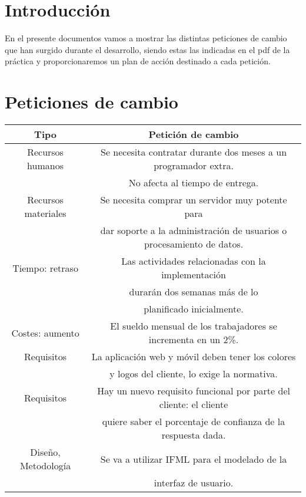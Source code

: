 	\listoftables	
	
	\newpage	
 
\section{Introducción}

En el presente documentos vamos a mostrar las distintas peticiones de cambio que han surgido durante el desarrollo, siendo estas las indicadas en el pdf de la práctica y proporcionaremos un plan de acción destinado a cada petición.

\section{Peticiones de cambio}

\begin{table}[H]
	\begin{center}
		\begin{tabular}{|c|c|} \toprule
			Tipo & Petición de cambio \\ \midrule
			Recursos humanos & Se necesita contratar durante dos meses a un programador extra.    \\ 
			& No afecta al tiempo de entrega. \\ \hline
			Recursos materiales & Se necesita comprar un servidor muy potente para  \\ 
			& dar soporte a la administración de usuarios o procesamiento de datos. \\ \hline
			Tiempo: retraso & Las actividades relacionadas con la implementación  \\ 
			& durarán dos semanas más de lo  \\ 
			& planificado inicialmente. \\ \hline
			Costes: aumento &  El sueldo mensual de los trabajadores se incrementa en un 2\%. \\ \hline
			Requisitos &  La aplicación web y móvil deben tener los colores \\ 
			& y logos del cliente, lo exige la normativa. \\ \hline
			Requisitos & Hay un nuevo requisito funcional por parte del cliente: el cliente  \\ 
			& quiere saber el porcentaje de confianza de la respuesta dada. \\ \hline
			Diseño, Metodología & Se va a utilizar IFML para el modelado de la   \\ 
			& interfaz de usuario. \\ \hline

\end{tabular}
\end{center}
\end{table}
